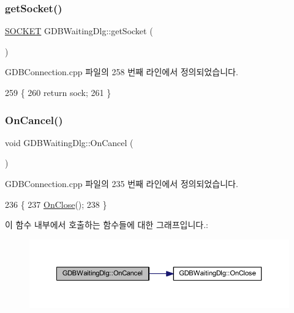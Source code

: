 \subsubsection{\texorpdfstring{get\+Socket()}{getSocket()}}
{\footnotesize\ttfamily \mbox{\hyperlink{remote_8cpp_aff55fe551a9992a54ec54621c524d0a4}{S\+O\+C\+K\+ET}} G\+D\+B\+Waiting\+Dlg\+::get\+Socket (\begin{DoxyParamCaption}{ }\end{DoxyParamCaption})}



G\+D\+B\+Connection.\+cpp 파일의 258 번째 라인에서 정의되었습니다.


\begin{DoxyCode}
259 \{
260   \textcolor{keywordflow}{return} sock;
261 \}
\end{DoxyCode}
\mbox{\label{class_g_d_b_waiting_dlg_a5838b8b0663a918e2ceaaa2018ed29ae}} 
\subsubsection{\texorpdfstring{On\+Cancel()}{OnCancel()}}
{\footnotesize\ttfamily void G\+D\+B\+Waiting\+Dlg\+::\+On\+Cancel (\begin{DoxyParamCaption}{ }\end{DoxyParamCaption})\hspace{0.3cm}{\ttfamily [protected]}}



G\+D\+B\+Connection.\+cpp 파일의 235 번째 라인에서 정의되었습니다.


\begin{DoxyCode}
236 \{
237   \mbox{\hyperlink{class_g_d_b_waiting_dlg_a9f08e30520f95b333ba224ebd41c47e3}{OnClose}}();
238 \}
\end{DoxyCode}
이 함수 내부에서 호출하는 함수들에 대한 그래프입니다.\+:
\nopagebreak
\begin{figure}[H]
\begin{center}
\leavevmode
\includegraphics[width=350pt]{class_g_d_b_waiting_dlg_a5838b8b0663a918e2ceaaa2018ed29ae_cgraph}
\end{center}
\end{figure}
\mbox{\label{class_g_d_b_waiting_dlg_a9f08e30520f95b333ba224ebd41c47e3}} 
